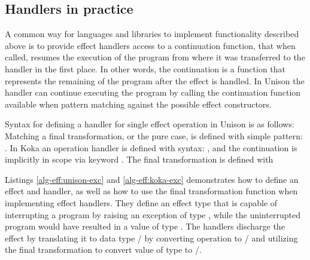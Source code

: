 

\subsection{Handlers in practice}
A common way for languages and libraries to implement functionality described above is to provide effect handlers access to a continuation function, that when called, resumes the execution of the program from where it was transferred to the handler in the first place. In other words, the continuation is a function that represents the remaining of the program after the effect is handled. In Unison the handler can continue executing the program by calling the continuation function available when pattern matching against the possible effect constructors.

Syntax for defining a handler for single effect operation in Unison is as follows:
\\
Matching a final transformation, or the pure case, is defined with simple pattern:
.
In Koka an operation handler is defined with syntax: , and the continuation is implicitly in scope via keyword . The final transformation is defined with 





Listings \ref{alg-eff:unison-exc} and \ref{alg-eff:koka-exc} demonstrates how to define an effect and handler, as well as how to use the final transformation function when implementing effect handlers. They define an effect type  that is capable of interrupting a program by raising an exception of type , while the uninterrupted program would have resulted in a value of type . The handlers discharge the effect by translating it to data type / by converting  operation to / and utilizing the final transformation to convert value of type  to /.

